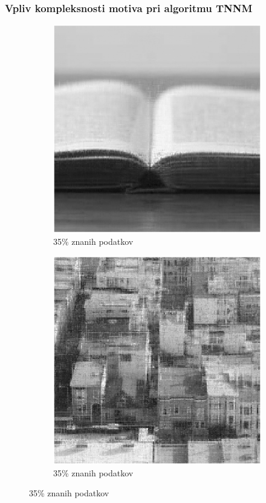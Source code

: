 \documentclass{beamer}
\begin{document}
\begin{frame}
  \frametitle{Vpliv kompleksnosti motiva pri algoritmu TNNM}
  \begin{figure}
    \begin{subfigure}{0.49\linewidth}
      \includegraphics[width=\linewidth]{slike/kompleksnost/rez35TNNMprep.png}
      \caption{35\% znanih podatkov}
    \end{subfigure}
    \begin{subfigure}{0.49\linewidth}
      \includegraphics[width=\linewidth]{slike/kompleksnost/rez35TNNMkomp.png}
      \caption{35\% znanih podatkov}
    \end{subfigure}
  \end{figure}
\end{frame}
\end{document}
